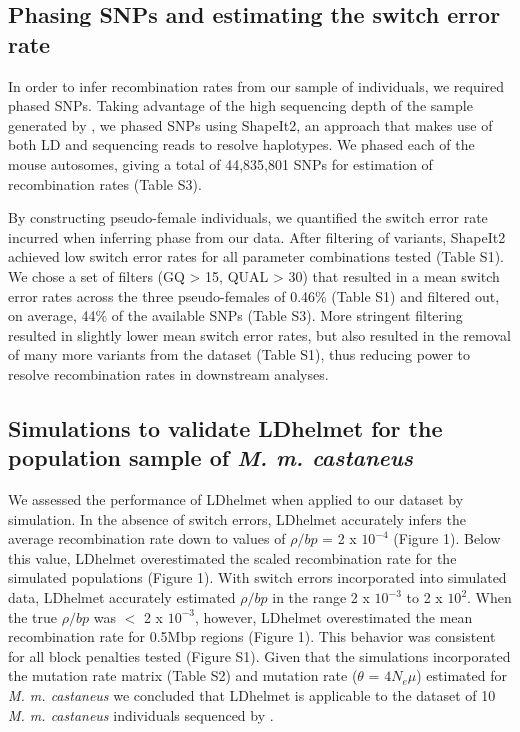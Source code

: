 \subsection{Phasing SNPs and estimating the switch error rate}
 
In order to infer recombination rates from our sample of individuals, we required phased SNPs. Taking advantage of the high sequencing depth of the sample generated by \cite{RN122}, we phased SNPs using ShapeIt2, an approach that makes use of both LD and sequencing reads to resolve haplotypes. We phased each of the mouse autosomes, giving a total of 44,835,801 SNPs for estimation of recombination rates (Table S3). 
 
By constructing pseudo-female individuals, we quantified the switch error rate incurred when inferring phase from our data. After filtering of variants, ShapeIt2 achieved low switch error rates for all parameter combinations tested (Table S1). We chose a set of filters (GQ > 15, QUAL > 30) that resulted in a mean switch error rates across the three pseudo-females of 0.46\% (Table S1) and filtered out, on average, 44\% of the available SNPs (Table S3). More stringent filtering resulted in slightly lower mean switch error rates, but also resulted in the removal of many more variants from the dataset (Table S1), thus reducing power to resolve recombination rates in downstream analyses.
 
\subsection{Simulations to validate LDhelmet for the population sample of \emph{M. m. castaneus}}
 
We assessed the performance of LDhelmet when applied to our dataset by simulation. In the absence of switch errors, LDhelmet accurately infers the average recombination rate down to values of $\rho/bp$ = 2 x $10^{-4}$ (Figure 1). Below this value, LDhelmet overestimated the scaled recombination rate for the simulated populations (Figure 1). With switch errors incorporated into simulated data, LDhelmet accurately estimated $\rho/bp$ in the range 2 x $10^{-3}$ to 2 x $10^{2}$. When the true $\rho/bp$ was $<$ 2 x $10^{-3}$, however, LDhelmet overestimated the mean recombination rate for 0.5Mbp regions (Figure 1). This behavior was consistent for all block penalties tested (Figure S1). Given that the simulations incorporated the mutation rate matrix (Table S2) and mutation rate ($\theta$ = $4N_{e}\mu$) estimated for \emph{M. m. castaneus} we concluded that LDhelmet is applicable to the dataset of 10 \emph{M. m. castaneus} individuals sequenced by \cite{RN122}.
 
